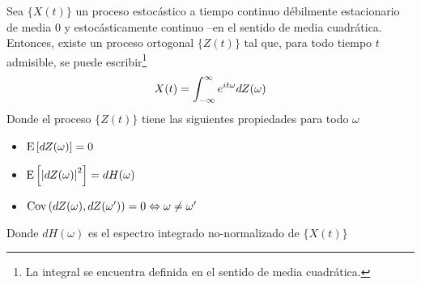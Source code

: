\begin{thrm}
Sea $\{X(t)\}$ un proceso estoc\'astico a tiempo continuo d\'ebilmente estacionario
de media 0
y estoc\'asticamente continuo --en el 
sentido de media cuadr\'atica. Entonces, existe un proceso ortogonal $\{Z(t)\}$ tal que, para 
todo tiempo $t$ admisible, se puede escribir\footnote{La integral se encuentra definida en el
sentido de media cuadr\'atica.}
\begin{equation*}
X(t) = \int_{-\infty}^{\infty} e^{i t \omega} dZ(\omega)
\end{equation*}
Donde el proceso $\{Z(t)\}$ tiene las siguientes propiedades para todo $\omega$
\begin{itemize}
\item $\mathrm{E}\left[ dZ(\omega) \right] = 0$
\item $\mathrm{E}\left[ \left| dZ(\omega) \right|^{2} \right] = dH(\omega)$
\item $\mathrm{Cov}\left( dZ(\omega),dZ(\omega^{\prime}) \right) = 0 \Leftrightarrow \omega \neq \omega^{\prime}$
\end{itemize}
Donde $dH(\omega)$ es el espectro integrado no-normalizado de $\{X(t)\}$
\end{thrm}


%

%
%

